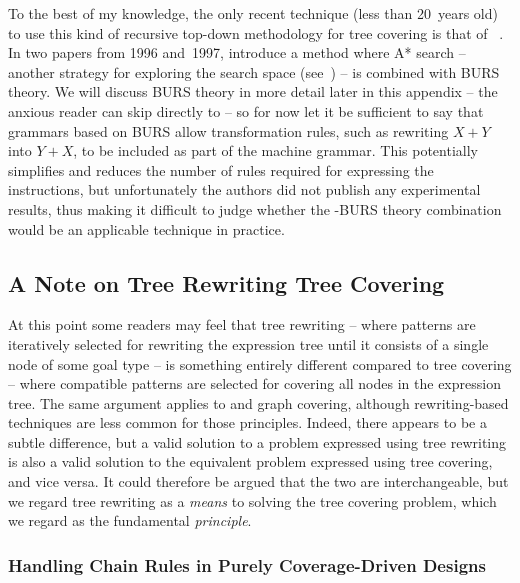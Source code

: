 To the best of my knowledge, the only recent technique (less than \num{20}~years
old) to use this kind of recursive top-down methodology for \gls{tree covering}
is that of \citeauthor{NymeyerEtAl:1996}~\cite{NymeyerEtAl:1996,
  NymeyerKatoen:1997}.
%
In two papers from 1996 and~1997, \citeauthor{NymeyerEtAl:1996} introduce a
method where \gls{A* search} -- another strategy for exploring the search space
(see~\cite{RussellNorvig:2010}) -- is combined with \gls{BURS} theory.
%
We will discuss \gls{BURS} theory in more detail later in this appendix -- the
anxious reader can skip directly to 
-- so for now let it be sufficient to say that \glspl{grammar} based on
\gls{BURS} allow transformation \glspl{rule}, such as rewriting \mbox{$X + Y$}
into \mbox{$Y + X$}, to be included as part of the \gls{machine grammar}.
%
This potentially simplifies and reduces the number of \glspl{rule} required for
expressing the \glspl{instruction}, but unfortunately the authors did not
publish any experimental results, thus making it difficult to judge whether the
\mbox{-\gls{BURS}} theory combination would be an applicable
technique in practice.


\subsection{A Note on Tree Rewriting \versus Tree Covering}

At this point some readers may feel that \gls{tree rewriting} -- where
\glspl{pattern} are iteratively selected for rewriting the \gls{expression tree}
until it consists of a single \gls{node} of some goal type -- is something
entirely different compared to \gls{tree covering} -- where compatible
\glspl{pattern} are selected for covering all \glspl{node} in the
\gls{expression tree}.
%
The same argument applies to  and \gls{graph covering},
although rewriting-based techniques are less common for those \glspl{principle}.
%
Indeed, there appears to be a subtle difference, but a valid solution to a
problem expressed using \gls{tree rewriting} is also a valid solution to the
equivalent problem expressed using \gls{tree covering}, and vice versa.
%
It could therefore be argued that the two are interchangeable, but we regard
\gls{tree rewriting} as a \emph{means} to solving the \gls{tree covering}
problem, which we regard as the fundamental \emph{\gls{principle}}.


\subsubsection{Handling Chain Rules in Purely Coverage-Driven Designs}


